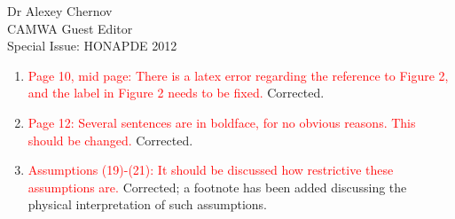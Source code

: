 \documentclass{letter}
\newcommand{\LRp}[1]{\left( #1 \right)}
\newcommand{\LRa}[1]{\left\langle #1 \right\rangle}
\newcommand{\uh}{\widehat{u}}
\newcommand{\fnh}{\widehat{f}_n}
\begin{document}
\begin{letter}{Dr Alexey Chernov\\CAMWA Guest Editor\\Special Issue: HONAPDE 2012}
\begin{enumerate}
Due to the nature of the ultra-weak variational formulation, the weak formulation for both standard boundary conditions on $u$ and the new boundary condition on $\Gamma_0$ are the same.  For convection-diffusion, the variational form is
\[
b\LRp{\LRp{u,\sigma,\uh,\fnh},\LRp{v,\tau}} = \LRa{\fnh,v} - \LRa{\uh,\tau_n} + \text{field/interior terms}
\]

The application of boundary conditions is equivalent to the imposition of a natural boundary condition in both cases, where either $\LRa{\fnh,v}_{\Gamma_0}$ or $\LRa{\uh,\tau_n}_{\Gamma_0}$ are given data and become forcing terms.  


Regarding the well-posedness of the variational problem, we refer the reviewer to \cite{analysisDPG}, whose analysis also covers the case of these boundary conditions (assuming well-posedness of the continuous problem), or \cite{Bui-ThanhDemkowiczGhattas11b}, where both the standard inflow boundary condition on $u$ and the proposed Robin boundary condition can be analyzed in the framework of Friedrichs systems.  

Regarding the well-posedness of the continuous problem, we refer the reviewer to \cite{Hesthaven96astable}, the paper of Dr Jan Hesthaven, where he proves well-posedness of both the transient case and the case as $\epsilon \rightarrow 0$.  

\item \textcolor{red}{Page 10, mid page: There is a latex error regarding the reference to Figure 2, and the label in Figure 2 needs to be fixed.}  Corrected.  

\item \textcolor{red}{Page 12: Several sentences are in boldface, for no obvious reasons. This should be changed. }  Corrected.

\item \textcolor{red}{Assumptions (19)-(21): It should be discussed how restrictive these assumptions are.} Corrected; a footnote has been added discussing the physical interpretation of such assumptions.  


\end{enumerate}
\end{letter}
\end{document}
